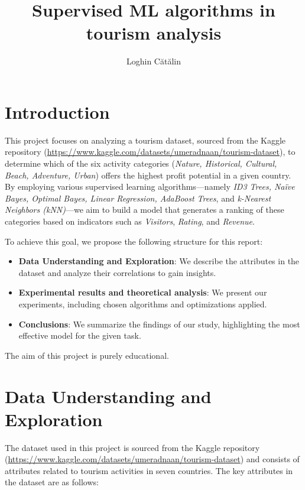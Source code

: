 \documentclass{article}
\title{Supervised ML algorithms in tourism analysis}
\author{Loghin Cătălin}
\begin{document}
\maketitle

\section{Introduction}
This project focuses on analyzing a tourism dataset, sourced from the Kaggle repository
(\url{https://www.kaggle.com/datasets/umeradnaan/tourism-dataset}), to determine which of the six
activity categories (\textit{Nature, Historical, Cultural, Beach, Adventure, Urban}) offers the highest
profit potential in a given country. By employing various supervised learning algorithms---namely
\textit{ID3 Trees, Na\"{i}ve Bayes, Optimal Bayes, Linear Regression, AdaBoost Trees}, and \textit{k-Nearest Neighbors (kNN)}---we aim
to build a model that generates a ranking of these categories based on indicators such as
\textit{Visitors}, \textit{Rating}, and \textit{Revenue}.

To achieve this goal, we propose the following structure for this report:
\begin{itemize}
    \item \textbf{Data Understanding and Exploration}:
          We describe the attributes in the dataset and analyze their correlations to gain insights.

    \item \textbf{Experimental results and theoretical analysis}:
          We present our experiments, including chosen algorithms and optimizations applied.
    \item \textbf{Conclusions}:
          We summarize the findings of our study, highlighting the most effective model for the given task.
\end{itemize}

The aim of this project is purely educational.

\section{Data Understanding and Exploration}
The dataset used in this project is sourced from the Kaggle repository
(\url{https://www.kaggle.com/datasets/umeradnaan/tourism-dataset}) and consists of attributes related to
tourism activities in seven countries. The key attributes in the dataset are as follows:
\end{document}
